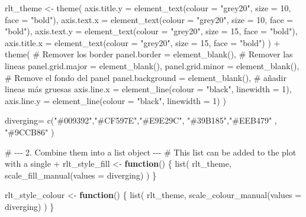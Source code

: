 \documentclass[
  12pt,
  letterpaper,
]{book}
\newenvironment{Shaded}{\begin{snugshade}}{\end{snugshade}}
\newcommand{\AttributeTok}[1]{\textcolor[rgb]{0.40,0.45,0.13}{#1}}
\newcommand{\CommentTok}[1]{\textcolor[rgb]{0.37,0.37,0.37}{#1}}
\newcommand{\ControlFlowTok}[1]{\textcolor[rgb]{0.00,0.23,0.31}{\textbf{#1}}}
\newcommand{\DecValTok}[1]{\textcolor[rgb]{0.68,0.00,0.00}{#1}}
\newcommand{\FunctionTok}[1]{\textcolor[rgb]{0.28,0.35,0.67}{#1}}
\newcommand{\NormalTok}[1]{\textcolor[rgb]{0.00,0.23,0.31}{#1}}
\newcommand{\OtherTok}[1]{\textcolor[rgb]{0.00,0.23,0.31}{#1}}
\newcommand{\SpecialCharTok}[1]{\textcolor[rgb]{0.37,0.37,0.37}{#1}}
\newcommand{\StringTok}[1]{\textcolor[rgb]{0.13,0.47,0.30}{#1}}
\begin{document}
\begin{Shaded}
\begin{Highlighting}[]
\NormalTok{rlt\_theme }\OtherTok{\textless{}{-}} \FunctionTok{theme}\NormalTok{(}
  \AttributeTok{axis.title.y =} \FunctionTok{element\_text}\NormalTok{(}\AttributeTok{colour =} \StringTok{"grey20"}\NormalTok{, }\AttributeTok{size =} \DecValTok{10}\NormalTok{, }\AttributeTok{face =} \StringTok{"bold"}\NormalTok{),}
  \AttributeTok{axis.text.x =} \FunctionTok{element\_text}\NormalTok{(}\AttributeTok{colour =} \StringTok{"grey20"}\NormalTok{, }\AttributeTok{size =} \DecValTok{10}\NormalTok{, }\AttributeTok{face =} \StringTok{"bold"}\NormalTok{),}
  \AttributeTok{axis.text.y =} \FunctionTok{element\_text}\NormalTok{(}\AttributeTok{colour =} \StringTok{"grey20"}\NormalTok{, }\AttributeTok{size =} \DecValTok{15}\NormalTok{, }\AttributeTok{face =} \StringTok{"bold"}\NormalTok{),}
  \AttributeTok{axis.title.x =} \FunctionTok{element\_text}\NormalTok{(}\AttributeTok{colour =} \StringTok{"grey20"}\NormalTok{, }\AttributeTok{size =} \DecValTok{15}\NormalTok{, }\AttributeTok{face =} \StringTok{"bold"}\NormalTok{)}
\NormalTok{) }\SpecialCharTok{+}
  \FunctionTok{theme}\NormalTok{(}
    \CommentTok{\# Remover los border}
    \AttributeTok{panel.border =} \FunctionTok{element\_blank}\NormalTok{(),}
    \CommentTok{\# Remover las lineas}
    \AttributeTok{panel.grid.major =} \FunctionTok{element\_blank}\NormalTok{(),}
    \AttributeTok{panel.grid.minor =} \FunctionTok{element\_blank}\NormalTok{(),}
    \CommentTok{\# Remove el fondo del panel}
    \AttributeTok{panel.background =} \FunctionTok{element\_blank}\NormalTok{(),}
    \CommentTok{\# añadir lineas más gruesas}
    \AttributeTok{axis.line.x =} \FunctionTok{element\_line}\NormalTok{(}\AttributeTok{colour =} \StringTok{"black"}\NormalTok{, }\AttributeTok{linewidth =} \DecValTok{1}\NormalTok{),}
    \AttributeTok{axis.line.y =} \FunctionTok{element\_line}\NormalTok{(}\AttributeTok{colour =} \StringTok{"black"}\NormalTok{, }\AttributeTok{linewidth =} \DecValTok{1}\NormalTok{)}
\NormalTok{  )}

\NormalTok{diverging}\OtherTok{=} \FunctionTok{c}\NormalTok{(}\StringTok{"\#009392"}\NormalTok{,}\StringTok{"\#CF597E"}\NormalTok{,}\StringTok{"\#E9E29C"}\NormalTok{, }\StringTok{"\#39B185"}\NormalTok{,}\StringTok{"\#EEB479"}\NormalTok{ , }\StringTok{"\#9CCB86"}\NormalTok{ )}


\CommentTok{\# {-}{-}{-} 2. Combine them into a list object {-}{-}{-}}
\CommentTok{\# This list can be added to the plot with a single \textquotesingle{}+\textquotesingle{}}
\NormalTok{rlt\_style\_fill }\OtherTok{\textless{}{-}} \ControlFlowTok{function}\NormalTok{() \{}
  \FunctionTok{list}\NormalTok{(}
\NormalTok{    rlt\_theme,}
    \FunctionTok{scale\_fill\_manual}\NormalTok{(}\AttributeTok{values =}\NormalTok{ diverging)}
\NormalTok{  )}
\NormalTok{\}}


\NormalTok{rlt\_style\_colour }\OtherTok{\textless{}{-}} \ControlFlowTok{function}\NormalTok{() \{}
  \FunctionTok{list}\NormalTok{(}
\NormalTok{    rlt\_theme,}
    \FunctionTok{scale\_colour\_manual}\NormalTok{(}\AttributeTok{values =}\NormalTok{ diverging)}
\NormalTok{  )}
\NormalTok{\}}
\end{Highlighting}
\end{Shaded}
\end{document}
